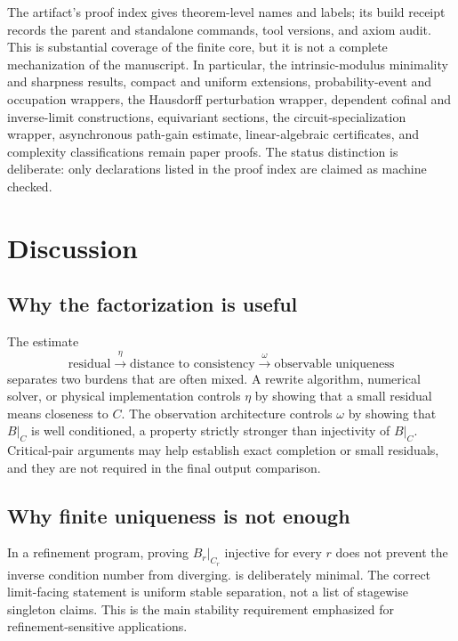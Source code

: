\documentclass[11pt]{article}
\theoremstyle{definition}
\theoremstyle{remark}
\numberwithin{equation}{section}
\begin{document}
The artifact's proof index gives theorem-level names and labels; its build
receipt records the parent and standalone commands, tool versions, and axiom
audit.  This is substantial coverage of the finite core, but it is not a
complete mechanization of the manuscript.  In
particular, the intrinsic-modulus minimality and sharpness results, compact
and uniform extensions, probability-event and occupation wrappers, the
Hausdorff perturbation wrapper, dependent cofinal and inverse-limit
constructions, equivariant sections, the circuit-specialization wrapper,
asynchronous path-gain estimate, linear-algebraic certificates, and
complexity classifications remain paper proofs.  The status distinction is
deliberate: only declarations listed in the proof index are claimed as
machine checked.

\section{Discussion}\label{sec:discussion}

\subsection{Why the factorization is useful}

The estimate
\[
 \text{residual}\xrightarrow{\ \eta\ }
 \text{distance to consistency}
 \xrightarrow{\ \omega\ }
 \text{observable uniqueness}
\]
separates two burdens that are often mixed.  A rewrite algorithm, numerical solver, or physical implementation controls $\eta$ by showing that a small residual means closeness to $C$.  The observation architecture controls $\omega$ by showing that $B|_C$ is well conditioned, a property strictly stronger than injectivity of $B|_C$.  Critical-pair arguments may help establish exact completion or small residuals, and they are not required in the final output comparison.

\subsection{Why finite uniqueness is not enough}

In a refinement program, proving $B_r|_{C_r}$ injective for every $r$ does not prevent the inverse condition number from diverging.   is deliberately minimal.  The correct limit-facing statement is uniform stable separation, not a list of stagewise singleton claims.  This is the main stability requirement emphasized for refinement-sensitive applications.
\end{document}
